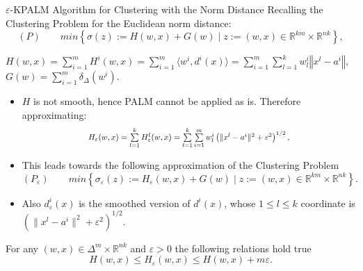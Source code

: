 \documentclass[9pt,handout]{beamer} %
\newcommand{\R}{\mathbb{R}} %
\newcommand{\norm}[1]{\left\Vert {#1} \right\Vert} %
\begin{document}
	\begin{frame}{$\varepsilon$-KPALM Algorithm for Clustering with the Norm Distance}
		Recalling the Clustering Problem for the Euclidean norm distance:
		\begin{equation*}
				(P) \qquad min \left\lbrace \sigma(z) := H(w,x) + G(w) \mid z := (w,x) \in \R^{km} \times \R^{nk} \right\rbrace, 
		\end{equation*}
		\begin{center}
		$H(w,x) = \sum\limits_{i=1}^{m} H^i(w,x) = \sum\limits_{i=1}^{m} \langle w^i , d^i(x) \rangle = \sum\limits_{i=1}^m\sum\limits_{l=1}^k w^i_l \norm{x^l - a^i}$, $G(w) = \sum\limits_{i=1}^{m} \delta_{\Delta}(w^i)$.\\
		\end{center}
		\begin{itemize}[<+->]
			\item $H$ is not smooth, hence PALM cannot be applied as is. Therefore approximating:
			\begin{equation*}
				\resizebox{.6\hsize}{!}{$H_{\varepsilon}(w,x) = \sum\limits_{l=1}^{k} H^l_{\varepsilon}(w,x)
	= \sum\limits_{l=1}^{k} \sum\limits_{i=1}^{m} w^i_l \left( \| x^l - a^i \|^2 + {\varepsilon}^2 \right)^{1/2},$}
			\end{equation*}
			\item This leads towards the following approximation of the Clustering Problem
			\begin{equation*}
				(P_{\varepsilon}) \qquad min \left\lbrace \sigma_{\varepsilon}(z) := H_{\varepsilon}(w,x) + G(w) \mid z := (w,x) \in \R^{km} \times \R^{nk} \right\rbrace.
			\end{equation*}
			\item Also $d^i_{\varepsilon}(x)$ is the smoothed version of $d^i(x)$, whose $1 \leq l \leq k$ coordinate is $\left( \|x^l - a^i\|^2 + {\varepsilon}^2 \right)^{1/2}$.
		\end{itemize}
		\pause
		\begin{lemma}
			For any $(w,x) \in {\Delta}^m \times \mathbb{R}^{nk}$ and $\varepsilon > 0$ the following relations hold true
			\begin{equation*}
				H(w,x) \leq H_{\varepsilon}(w,x) \leq H(w,x) + m\varepsilon .
			\end{equation*}
		\end{lemma}
	\end{frame}
	
\end{document}
